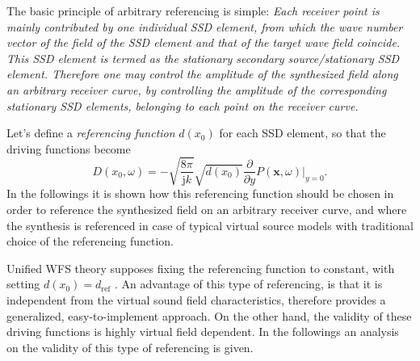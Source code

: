 \documentclass[12pt,a4paper]{article}
\newcommand{\te}{\mathrm{e}}
\newcommand{\ti}{\mathrm{j}}
\newcommand{\sinfi}{\sin\varphi}
\newcommand{\cosfi}{\cos\varphi}
\newcommand{\dref}{d_{\mathrm{ref}}}
\newcommand{\vx}{\mathbf{x}}
\begin{document}
The basic principle of arbitrary referencing is simple:
\emph{Each receiver point is mainly contributed by one individual SSD element, from which the wave number vector of the field of the SSD element and that of the target wave field coincide. This SSD element is termed as the stationary secondary source/stationary SSD element.
Therefore one may control the amplitude of the synthesized field along an arbitrary receiver curve, by controlling the amplitude of the corresponding stationary SSD elements, belonging to each point on the receiver curve.}
 
\vspace{3mm}
Let's define a \emph{referencing function} $d(x_0)$ for each SSD element, so that the driving functions become
\begin{equation}
D(x_0,\omega) = 
- \sqrt{\frac{8\pi}{\ti k}} \sqrt{d(x_0)} \frac{\partial}{\partial y} \left. P(\vx,\omega) \right|_{y = 0}.
\label{Eq:Gen_rayleigh_dx0}
\end{equation}
In the followings it is shown how this referencing function should be chosen in order to reference the synthesized field on an arbitrary receiver curve, and where the synthesis is referenced in case of typical virtual source models with traditional choice of the referencing function.

Unified WFS theory supposes fixing the referencing function to constant, with setting $d(x_0) = \dref$ \cite{Ahrens2012}.
An advantage of this type of referencing, is that it is independent from the virtual sound field characteristics, therefore provides a generalized, easy-to-implement approach. On the other hand, the validity of these driving functions is highly virtual field dependent. In the followings an analysis on the validity of this type of referencing is given.

\end{document}
